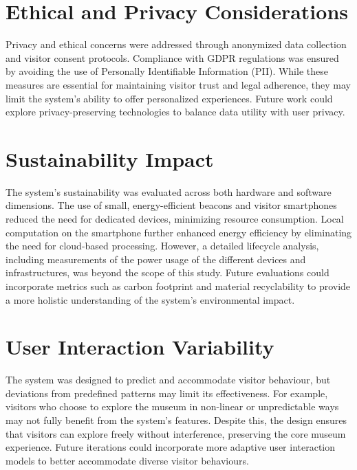 \section{Ethical and Privacy Considerations}
Privacy and ethical concerns were addressed through anonymized data collection and visitor consent protocols. Compliance with GDPR regulations was ensured by avoiding the use of Personally Identifiable Information (PII). While these measures are essential for maintaining visitor trust and legal adherence, they may limit the system’s ability to offer personalized experiences. Future work could explore privacy-preserving technologies to balance data utility with user privacy.

\section{Sustainability Impact}
The system’s sustainability was evaluated across both hardware and software dimensions. The use of small, energy-efficient beacons and visitor smartphones reduced the need for dedicated devices, minimizing resource consumption. Local computation on the smartphone further enhanced energy efficiency by eliminating the need for cloud-based processing. However, a detailed lifecycle analysis, including measurements of the power usage of the different devices and infrastructures, was beyond the scope of this study. Future evaluations could incorporate metrics such as carbon footprint and material recyclability to provide a more holistic understanding of the system’s environmental impact.

\section{User Interaction Variability}
The system was designed to predict and accommodate visitor behaviour, but deviations from predefined patterns may limit its effectiveness. For example, visitors who choose to explore the museum in non-linear or unpredictable ways may not fully benefit from the system’s features. Despite this, the design ensures that visitors can explore freely without interference, preserving the core museum experience. Future iterations could incorporate more adaptive user interaction models to better accommodate diverse visitor behaviours. 


